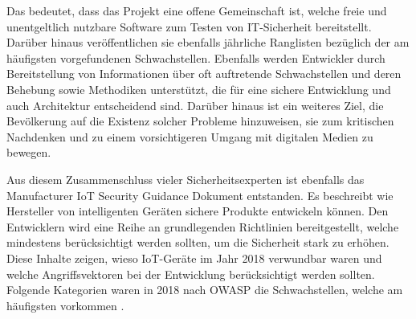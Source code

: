         Das bedeutet, dass das Projekt eine offene Gemeinschaft ist, welche freie und unentgeltlich nutzbare Software zum Testen von IT-Sicherheit bereitstellt. Darüber hinaus veröffentlichen sie ebenfalls jährliche Ranglisten bezüglich der am häufigsten vorgefundenen Schwachstellen. Ebenfalls werden Entwickler durch Bereitstellung von Informationen über oft auftretende Schwachstellen und deren Behebung sowie Methodiken unterstützt, die für eine sichere Entwicklung und auch Architektur entscheidend sind. Darüber hinaus ist ein weiteres Ziel, die Bevölkerung auf die Existenz solcher Probleme hinzuweisen, sie zum kritischen Nachdenken und zu einem vorsichtigeren Umgang mit digitalen Medien zu bewegen.
        
        Aus diesem Zusammenschluss vieler Sicherheitsexperten ist ebenfalls das \glqq Manufacturer \ac{IoT} Security Guidance\grqq{} Dokument \cite{stahl_2017} entstanden. Es beschreibt wie Hersteller von intelligenten Geräten sichere Produkte entwickeln können. Den Entwicklern wird eine Reihe an grundlegenden Richtlinien bereitgestellt, welche mindestens berücksichtigt werden sollten, um die Sicherheit stark zu erhöhen.
        Diese Inhalte zeigen, wieso \ac{IoT}-Geräte im Jahr 2018 verwundbar waren und welche Angriffsvektoren bei der Entwicklung berücksichtigt werden sollten. 
        Folgende Kategorien waren in 2018 nach \ac{OWASP} die Schwachstellen, welche am häufigsten vorkommen \cite{stahl_2017}. 
